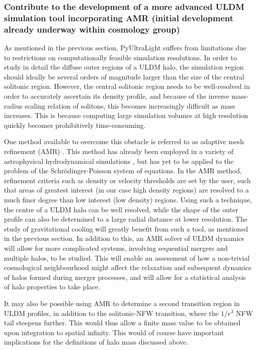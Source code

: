 \subsubsection{Contribute to the development of a more advanced ULDM simulation tool incorporating AMR (initial development already underway within cosmology group)}

As mentioned in the previous section, PyUltraLight suffers from limitations due to restrictions on computationally feasible simulation resolutions. In order to study in detail the diffuse outer regions of a ULDM halo, the simulation region should ideally be several orders of magnitude larger than the size of the central solitonic region. However, the central solitonic region needs to be well-resolved in order to accurately ascertain its density profile, and because of the inverse mass-radius scaling relation of solitons, this becomes increasingly difficult as mass increases. This is because computing large simulation volumes at high resolution quickly becomes prohibitively time-consuming.

One method available to overcome this obstacle is referred to as adaptive mesh refinement (AMR) \cite{2018arXiv181001319B, Snaith:2018ghc}. This method has already been employed in a variety of astrophysical hydrodynamical simulations \cite{Almgren:2013sz}, but has yet to be applied to the problem of the Schr{\"o}dinger-Poisson system of equations. In the AMR method, refinement criteria such as density or velocity thresholds are set by the user, such that areas of greatest interest (in our case high density regions) are resolved to a much finer degree than low interest (low density) regions. Using such a technique, the centre of a ULDM halo can be well resolved, while the shape of the outer profile can also be determined to a large radial distance at lower resolution. The study of gravitational cooling will greatly benefit from such a tool, as mentioned in the previous section. In addition to this, an AMR solver of ULDM dynamics will allow for more complicated systems, involving sequential mergers and multiple halos, to be studied. This will enable an assessment of how a non-trivial cosmological neighbourhood might affect the relaxation and subsequent dynamics of halos formed during merger processes, and will allow for a statistical analysis of halo properties to take place.

It may also be possible using AMR to determine a second transition region in ULDM profiles, in addition to the solitonic-NFW transition, where the $1/r^3$ NFW tail steepens further. This would thus allow a finite mass value to be obtained upon integration to spatial infinity. This would of course have important implications for the definitions of halo mass discussed above. 

